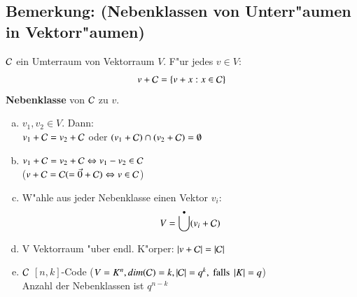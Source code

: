 \subsection{Bemerkung: (Nebenklassen von Unterr"aumen in Vektorr"aumen)}
$\mathcal{C}$ ein Umterraum von Vektorraum $V$. F"ur jedes $v \in V$:
\[
	v + \mathcal{C} = \lbrace v+x : x \in \mathcal{C} \rbrace
\]
\textbf{Nebenklasse} von $\mathcal{C}$ zu $v$.
\begin{enumerate}[a)]
	\item $v_1,v_2 \in V$. Dann: \\
					$v_1 + \mathcal{C} = v_2 + \mathcal{C}$ oder $(v_1 + \mathcal{C}) \cap (v_2 + \mathcal{C}) = \emptyset$
	\item $v_1 + \mathcal{C} = v_2 + \mathcal{C} \Leftrightarrow v_1-v_2 \in \mathcal{C}$\\
						($v+ \mathcal{C} = \mathcal{C} (=\vec{0}+\mathcal{C}) \Leftrightarrow v \in \mathcal{C}$)
	\item W"ahle aus jeder Nebenklasse einen Vektor $v_i$:
	\[
			V=\bigcup^{\bullet} (v_i + \mathcal{C})
	\]
	\item V Vektorraum "uber endl. K"orper: $\left| v + \mathcal{C} \right| = \left| \mathcal{C} \right|$
	\item $\mathcal{C}$ $[n,k]$-Code ($V=K^n, dim(\mathcal{C})=k,\left|\mathcal{C}\right|=q^k, \text{ falls } \left|K\right|=q$) \\
						Anzahl der Nebenklassen ist $q^{n-k}$
\end{enumerate}

